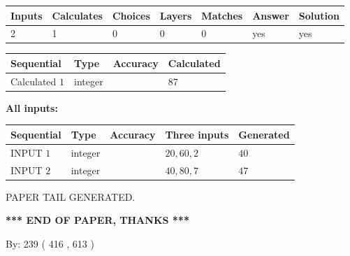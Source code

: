 \documentclass{ctexart}
\begin{document}
   
\noindent\begin{tabular}{|l|l|l|l|l|l|l|}
 \hline
Inputs & Calculates & Choices & Layers & Matches & Answer & Solution \\ \hline
 2  & 
 1  & 
 0
  & 
 0  & 
 0  & 
  yes & 
  yes 
  \\ \hline
 \end{tabular}
   
   
   
   
\noindent{}
   
   
  
  
\noindent\begin{tabular}{|l|l|l|l|}
\hline
 Sequential & Type & Accuracy & Calculated \\ 
\hline
 
 
  Calculated $  1 $ & integer &  & 
  $ 87 $ 
 \\  \hline  
 \end{tabular}
   
   
   
   
\noindent\vspace{0.1in}\hspace{-0.08in} {\textbf{\Large{All inputs: }}}
   
   
  
  
\noindent\begin{tabular}{|l|l|l|l|l|}
\hline
 Sequential & Type & Accuracy & Three inputs & Generated \\ 
\hline
 
 
  INPUT $  1 $ & integer &  & $
 20
 , 
 60
 , 
 2
 $ & $ 40 $ 
 \\  \hline  
 
 
  INPUT $  2 $ & integer &  & $
 40
 , 
 80
 , 
 7
 $ & $ 47 $ 
 \\  \hline  
 \end{tabular}
   
   
   
   
   
   
 \vspace{0.2in}
 
   
   
\vspace{2.0in} PAPER TAIL GENERATED.
   
   
   
   
\vspace{1.0in} 
{\textbf{\large{ *** END OF PAPER, THANKS *** }}} 
   
   
\hspace{1.0in} By: 
 239 ( 416 ,  613 )
   
\end{document}
